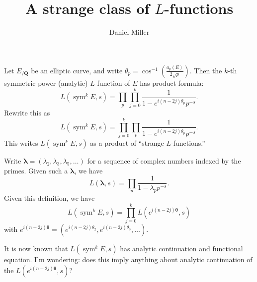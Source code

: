 \documentclass{article}
\title{A strange class of $L$-functions}
\author{Daniel Miller}
\DeclareMathOperator{\sym}{sym}
\newcommand{\blambda}{{\boldsymbol\lambda}}
\newcommand{\bQ}{\mathbf{Q}}
\newcommand{\btheta}{{\boldsymbol\theta}}
\begin{document}
\maketitle





Let $E_{/\bQ}$ be an elliptic curve, and write 
$\theta_p = \cos^{-1}\left(\frac{a_p(E)}{2\sqrt p}\right)$. Then the 
$k$-th symmetric power (analytic) $L$-function of $E$ has product formula: 
\[
	L(\sym^k E,s) = \prod_p \prod_{j=0}^k \frac{1}{1-e^{i(n-2j)\theta_p} p^{-s}} .
\]
Rewrite this as 
\[
	L(\sym^k E,s) = \prod_{j=0}^k \prod_p \frac{1}{1-e^{i(n-2j)\theta_p} p^{-s}} .
\]
This writes $L(\sym^k E,s)$ as a product of ``strange $L$-functions.''


Write $\blambda=(\lambda_2,\lambda_3,\lambda_5,\dots)$ for a sequence of 
complex numbers indexed by the primes. Given such a $\blambda$, we have 
\[
	L(\blambda,s) = \prod_p \frac{1}{1-\lambda_p p^{-s}} .
\]
Given this definition, we have 
\[
	L(\sym^k E,s) = \prod_{j=0}^k L(e^{i(n-2j)\btheta},s)
\]
with $e^{i(n-2j)\btheta} = (e^{i(n-2j)\theta_2},e^{i(n-2j)\theta_3},\dots)$. 

It is now known that $L(\sym^k E,s)$ has analytic continuation and functional 
equation. I'm wondering: does this imply anything about analytic continuation 
of the $L(e^{i(n-2j)\btheta},s)$? 
\end{document}
